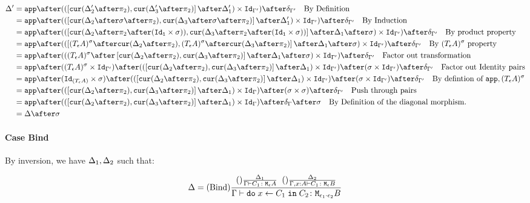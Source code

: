 \documentclass{report}
\begin{document}
\begin{align}
    \D' & =\app\after((\fld{\cur{\D_2'\after\pp}}{\cur{\D_3'\after\pp}}\after\D_1')\times \Id{\G'})\after\diag{\G'}\qt{By Definition}\\
    & =\app\after((\fld{\cur{\D_2\after\si\after\pp}}{\cur{\D_3\after\si\after\pp}}\after\D_1')\times \Id{\G'})\after\diag{\G'}\qt{By Induction}\\
    & = \app\after((\fld{\cur{\D_2\after\pp\after(\Id{\1}\times \si)}}{\cur{\D_3\after\pp\after(\Id{\1}\times \si)}}\after\D_1\after\si)\times \Id{\G'})\after\diag{\G'}\qt{By product property}\\
    & = \app\after((\fld{(\tea)^{\si}\after\cur{\D_2\after\pp}}{(\tea)^{\si}\after\cur{\D_3\after\pp}}\after\D_1\after\si)\times \Id{\G'})\after\diag{\G'}\qt{By $(\tea)^{\si}$ property}\\
    & = \app\after(((\tea)^{\si}\after\fld{\cur{\D_2\after\pp}}{\cur{\D_3\after\pp}}\after\D_1\after\si)\times \Id{\G'})\after\diag{\G'}\qt{Factor out transformation}\\
    & = \app\after((\tea)^{\si}\times\Id{\G'})\after((\fld{\cur{\D_2\after\pp}}{\cur{\D_3\after\pp}}\after\D_1)\times \Id{\G'})\after(\si \times \Id{\G'})\after\diag{\G'}\qt{Factor out Identity pairs}\\
    & = \app\after(\Id{(\tea)}\times\si)\after((\fld{\cur{\D_2\after\pp}}{\cur{\D_3\after\pp}}\after\D_1) \times \Id{\G'})\after(\si \times \Id{\G'})\after\diag{\G'}\qt{By defintion of $\app, (\tea)^{\si}$}\\
    & = \app\after((\fld{\cur{\D_2\after\pp}}{\cur{\D_3\after\pp}}\after\D_1)\times \idg)\after(\si \times \si)\after\diag{\G'}\qt{Push through pairs}\\
    & = \app\after((\fld{\cur{\D_2\after\pp}}{\cur{\D_3\after\pp}}\after\D_1)\times \idg)\after\diag{\G}\after\si\qt{By Definition of the diagonal morphism.}\\
    & = \D\after\si
\end{align}


\paragraph{Case Bind}

By inversion, we have $\Delta_1, \Delta_2$ such that:

\begin{equation}
    \Delta = (\text{Bind}) \frac{
        (\text{}) \frac{\Delta_1}{\Gamma \vdash C_1 \colon \texttt{M}_{\epsilon}{A}}
        \;\;
        (\text{}) \frac{\Delta_2}{\Gamma, x:A  \vdash C_1 \colon \texttt{M}_{\epsilon}{B}}
    }{
        \Gamma \vdash \texttt{do}\; x \leftarrow C_1 \;\texttt{in}\; C_2 \colon \texttt{M}_{\epsilon_1\cdot\epsilon_2}{B}
    }
\end{equation}
\end{document}
